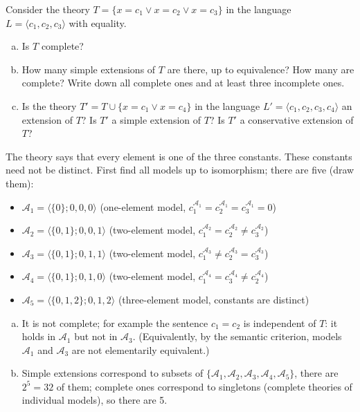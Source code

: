 \begin{problem}

    Consider the theory $T=\{x=c_1 \vee x=c_2 \vee x=c_3\}$ in the language $L=\langle c_1,c_2,c_3\rangle$ with equality.
    \begin{enumerate}[(a)]     
        \item Is $T$ complete?
        \item How many simple extensions of $T$ are there, up to equivalence? How many are complete? Write down all complete ones and at least three incomplete ones.
        \item Is the theory $T'=T\cup\{x=c_1 \vee x=c_4\}$ in the language $L'=\langle c_1,c_2,c_3,c_4\rangle$ an extension of $T$? Is $T'$ a simple extension of $T$? Is $T'$ a conservative extension of $T$?
    \end{enumerate}

    \begin{solution}
        
        The theory says that every element is one of the three constants. These constants need not be distinct. First find all models up to isomorphism; there are five (draw them):
        \begin{itemize}
            \item $\mathcal A_1=\langle\{0\};0,0,0\rangle$ (one-element model, $c_1^{\mathcal A_1}=c_2^{\mathcal A_1}=c_3^{\mathcal A_1}=0$)
            \item $\mathcal A_2=\langle\{0,1\};0,0,1\rangle$ (two-element model, $c_1^{\mathcal A_2}=c_2^{\mathcal A_2}\neq c_3^{\mathcal A_2}$)
            \item $\mathcal A_3=\langle\{0,1\};0,1,1\rangle$ (two-element model, $c_1^{\mathcal A_3}\neq c_2^{\mathcal A_3}=c_3^{\mathcal A_3}$) 
            \item $\mathcal A_4=\langle\{0,1\};0,1,0\rangle$ (two-element model, $c_1^{\mathcal A_4}=c_3^{\mathcal A_4}\neq c_2^{\mathcal A_4}$)
            \item $\mathcal A_5=\langle\{0,1,2\};0,1,2\rangle$ (three-element model, constants are distinct)
        \end{itemize}
        \begin{enumerate}[(a)]
            \item It is not complete; for example the sentence $c_1=c_2$ is independent of $T$: it holds in $\mathcal A_1$ but not in $\mathcal A_3$. (Equivalently, by the semantic criterion, models $\mathcal A_1$ and $\mathcal A_3$ are not elementarily equivalent.)
            \item Simple extensions correspond to subsets of $\{\mathcal A_1,\mathcal A_2,\mathcal A_3,\mathcal A_4,\mathcal A_5\}$, there are $2^5=32$ of them; complete ones correspond to singletons (complete theories of individual models), so there are 5.
            

\end{enumerate}
\end{solution}
\end{problem}

